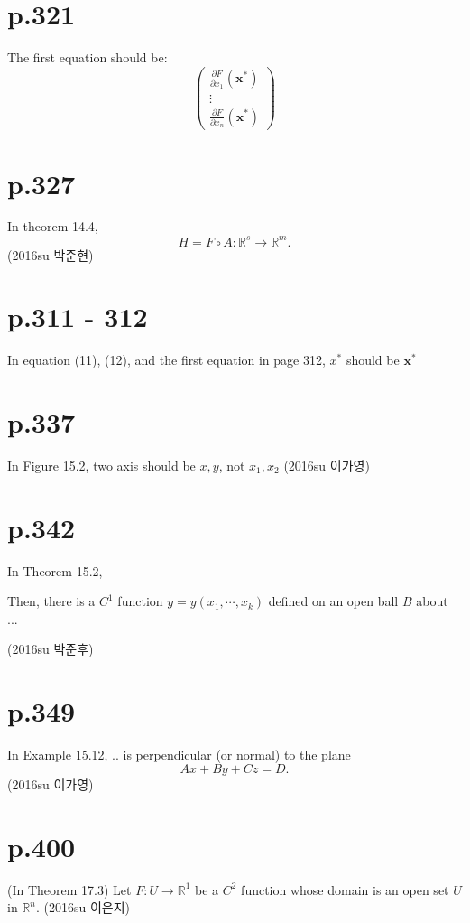 \documentclass[a4paper]{article}
\begin{document}
\section{p.321}
The first equation should be: \[
\begin{pmatrix}
	\frac{\partial F}{\partial x_1}(\mathbf{x}^\ast)\\
	\vdots\\
	\frac{\partial F}{\partial x_n}(\mathbf{x}^\ast)
\end{pmatrix}
\]

\section{p.327} %
\label{sec:p_327}
In theorem 14.4,
\[
	H = F \circ A : \mathbb{R}^s \rightarrow \mathbb{R}^m.
\]
(2016su 박준현)

\section{p.311 - 312} %
\label{sec:p_311}
In equation (11), (12), and the first equation in page 312, $x^\ast$ should be $\mathbf{x}^\ast$

\section{p.337} %
\label{sec:p_337}
In Figure 15.2, two axis should be $x,y$, not $x_1, x_2$ (2016su 이가영)

\section{p.342} %
\label{sec:p_342}
In Theorem 15.2,

Then, there is a $C^1$ function $y=y(x_1,\cdots,x_k)$ defined on an open ball $B$ about ...

(2016su 박준후)

\section{p.349} %
\label{sec:p_349}
In Example 15.12, .. is perpendicular (or normal) to the plane\[
	Ax+By+Cz=D.
\](2016su 이가영)

\section{p.400} %
\label{sec:p_400}
(In Theorem 17.3) Let $F:U\rightarrow \mathbb{R}^1$ be a $C^2$ function whose domain is an open set $U$ in $\mathbb{R}^n$.
(2016su 이은지)
\end{document}
